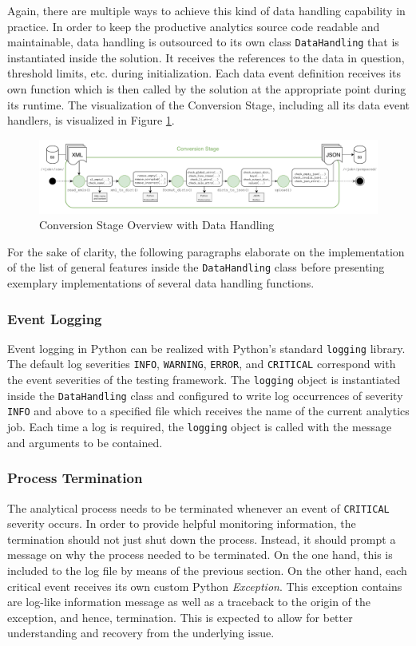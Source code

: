 Again, there are multiple ways to achieve this kind of data handling capability in practice. In order to keep the productive analytics source code readable and maintainable, data handling is outsourced to its own class \texttt{DataHandling} that is instantiated inside the solution. It receives the references to the data in question, threshold limits, etc. during initialization. Each data event definition receives its own function which is then called by the solution at the appropriate point during its runtime. The visualization of the Conversion Stage, including all its data event handlers, is visualized in Figure \ref{fig:5-new-convert}.

\begin{figure}
	\centering
	\includegraphics[width=\linewidth]{main-matter/img/5-new-convert}
	\caption{Conversion Stage Overview with Data Handling}
	\label{fig:5-new-convert}
\end{figure}

For the sake of clarity, the following paragraphs elaborate on the implementation of the list of general features inside the \texttt{DataHandling} class before presenting exemplary implementations of several data handling functions.

\subsubsection{Event Logging}
Event logging in Python can be realized with Python's standard \texttt{logging} library. The default log severities \texttt{INFO}, \texttt{WARNING}, \texttt{ERROR}, and \texttt{CRITICAL} correspond with the event severities of the testing framework. The \texttt{logging} object is instantiated inside the \texttt{DataHandling} class and configured to write log occurrences of severity \texttt{INFO} and above to a specified file which receives the name of the current analytics job. Each time a log is required, the \texttt{logging} object is called with the message and arguments to be contained.

\subsubsection{Process Termination}
The analytical process needs to be terminated whenever an event of \texttt{CRITICAL} severity occurs. In order to provide helpful monitoring information, the termination should not just shut down the process. Instead, it should prompt a message on why the process needed to be terminated. On the one hand, this is included to the log file by means of the previous section. On the other hand, each critical event receives its own custom Python \textit{Exception}. This exception contains are log-like information message as well as a traceback to the origin of the exception, and hence, termination. This is expected to allow for better understanding and recovery from the underlying issue.

